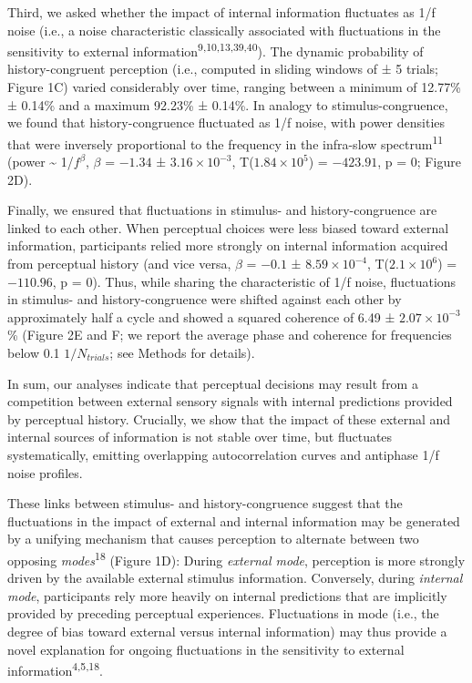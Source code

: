 \documentclass[
]{article}
\begin{document}
Third, we asked whether the impact of internal information fluctuates as
1/f noise (i.e., a noise characteristic classically associated with
fluctuations in the sensitivity to external
information\textsuperscript{9,10,13,39,40}). The dynamic probability of
history-congruent perception (i.e., computed in sliding windows of ± 5
trials; Figure 1C) varied considerably over time, ranging between a
minimum of 12.77\% ± 0.14\% and a maximum 92.23\% ± 0.14\%. In analogy
to stimulus-congruence, we found that history-congruence fluctuated as
1/f noise, with power densities that were inversely proportional to the
frequency in the infra-slow spectrum\textsuperscript{11} (power
\textasciitilde{} 1/\(f^\beta\), \(\beta\) = \(-1.34\) ±
\(\ensuremath{3.16\times 10^{-3}}\),
T(\(\ensuremath{1.84\times 10^{5}}\)) = \(-423.91\), p = \(0\); Figure
2D).

Finally, we ensured that fluctuations in stimulus- and
history-congruence are linked to each other. When perceptual choices
were less biased toward external information, participants relied more
strongly on internal information acquired from perceptual history (and
vice versa, \(\beta\) = \(-0.1\) ± \(\ensuremath{8.59\times 10^{-4}}\),
T(\(\ensuremath{2.1\times 10^{6}}\)) = \(-110.96\), p = \(0\)). Thus,
while sharing the characteristic of 1/f noise, fluctuations in stimulus-
and history-congruence were shifted against each other by approximately
half a cycle and showed a squared coherence of 6.49 ±
\ensuremath{2.07\times 10^{-3}}\% (Figure 2E and F; we report the
average phase and coherence for frequencies below 0.1 \(1/N_{trials}\);
see Methods for details).

In sum, our analyses indicate that perceptual decisions may result from
a competition between external sensory signals with internal predictions
provided by perceptual history. Crucially, we show that the impact of
these external and internal sources of information is not stable over
time, but fluctuates systematically, emitting overlapping
autocorrelation curves and antiphase 1/f noise profiles.

These links between stimulus- and history-congruence suggest that the
fluctuations in the impact of external and internal information may be
generated by a unifying mechanism that causes perception to alternate
between two opposing \emph{modes}\textsuperscript{18} (Figure 1D):
During \emph{external mode}, perception is more strongly driven by the
available external stimulus information. Conversely, during
\emph{internal mode}, participants rely more heavily on internal
predictions that are implicitly provided by preceding perceptual
experiences. Fluctuations in mode (i.e., the degree of bias toward
external versus internal information) may thus provide a novel
explanation for ongoing fluctuations in the sensitivity to external
information\textsuperscript{4,5,18}.
\end{document}
